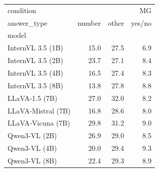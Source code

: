 \begin{tabular}{lrrr}
\toprule
condition & \multicolumn{3}{r}{MG} \\
answer_type & number & other & yes/no \\
model &  &  &  \\
\midrule
InternVL 3.5 (1B) & 15.0 & 27.5 & 6.9 \\
InternVL 3.5 (2B) & 23.7 & 27.1 & 8.4 \\
InternVL 3.5 (4B) & 16.5 & 27.4 & 8.3 \\
InternVL 3.5 (8B) & 13.8 & 27.8 & 8.8 \\
LLaVA‑1.5 (7B) & 27.0 & 32.0 & 8.2 \\
LLaVA‑Mistral (7B) & 16.8 & 28.6 & 8.0 \\
LLaVA‑Vicuna (7B) & 29.8 & 31.2 & 9.0 \\
Qwen3‑VL (2B) & 26.9 & 29.0 & 8.5 \\
Qwen3‑VL (4B) & 20.0 & 29.4 & 9.3 \\
Qwen3‑VL (8B) & 22.4 & 29.3 & 8.9 \\
\bottomrule
\end{tabular}
